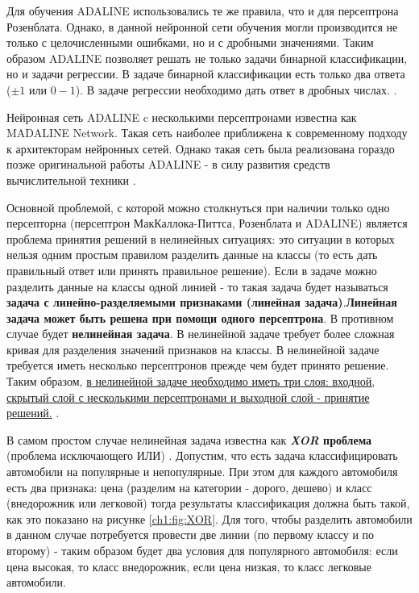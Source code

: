 \documentclass[12pt]{article}
\begin{document}
\begin{sloppypar}
Для обучения ADALINE использовались те же правила, что и для персептрона Розенблата. 
Однако, в данной нейронной сети обучения могли производится не только с целочисленными ошибками, но и с дробными значениями. Таким образом ADALINE позволяет решать не только задачи бинарной классификации, но и задачи регрессии. В задаче бинарной классификации есть только два ответа ($\pm 1$ или $0-1$). В задаче регрессии необходимо дать ответ в дробных числах. 
\cite{kelleher2019deep}. 

Нейронная сеть ADALINE c несколькими персептронами известна как MADALINE  Network. Такая сеть наиболее приближена к современному подходу к архитекторам нейронных сетей. Однако такая сеть была реализована гораздо позже оригинальной работы ADALINE - в силу развития средств вычислительной техники 
\cite{kelleher2019deep}.   

Основной проблемой, с которой можно столкнуться при наличии только одно персепторна (персептрон МакКаллока-Питтса, Розенблата и ADALINE) является проблема принятия решений в нелинейных ситуациях: это ситуации в которых нельзя одним простым правилом разделить данные на классы (то есть дать правильный ответ или принять правильное решение). Если в задаче можно разделить данные на классы одной линией - то такая задача будет называться \textbf{задача с линейно-разделяемыми признаками (линейная задача)}.\textbf{Линейная задача может быть решена при помощи одного персептрона}. В противном случае будет \textbf{нелинейная задача}. В нелинейной задаче требует более сложная кривая для разделения значений признаков на классы. В нелинейной задаче требуется иметь несколько персептронов прежде чем будет принято решение. Таким образом, \uline{в нелинейной задаче необходимо иметь три слоя: входной, скрытый слой с несколькими персептронами и выходной слой - принятие решений.}
\cite{goodfellow2016deep}.

В самом простом случае нелинейная задача известна как \textbf{\emph{XOR} проблема} (проблема исключающего ИЛИ) 
\cite{minsky1969introduction}.
Допустим, что есть задача классифицировать автомобили на популярные и непопулярные. При этом для каждого автомобиля есть два признака: цена (разделим на категории - дорого, дешево) и класс (внедорожник или легковой) тогда результаты классификация должна быть такой, как это показано на рисунке \ref{ch1:fig:XOR}. Для того, чтобы разделить автомобили в данном случае потребуется провести две линии (по первому классу и по второму) - таким образом будет два условия для популярного автомобиля: если цена высокая, то класс внедорожник, если цена низкая, то класс легковые автомобили.


\end{sloppypar}
\end{document}
